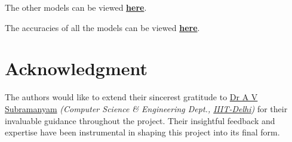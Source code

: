 \documentclass[conference]{IEEEtran}
\begin{document}
    The other models can be viewed \href{https://github.com/Vikranth3140/Movie-Revenue-Prediction/tree/main/models}{\textbf{here}}.

    The accuracies of all the models can be viewed \href{https://github.com/Vikranth3140/Movie-Revenue-Prediction/blob/main/models/accuracies.text}{\textbf{here}}.

\section*{Acknowledgment}
    The authors would like to extend their sincerest gratitude to \href{https://www.iiitd.ac.in/subramanyam}{Dr A V Subramanyam} \textit{(Computer Science \& Engineering Dept., \href{https://www.iiitd.ac.in/}{IIIT-Delhi})} for their invaluable guidance throughout the project.
    Their insightful feedback and expertise have been instrumental in shaping this project into its final form.
\end{document}
